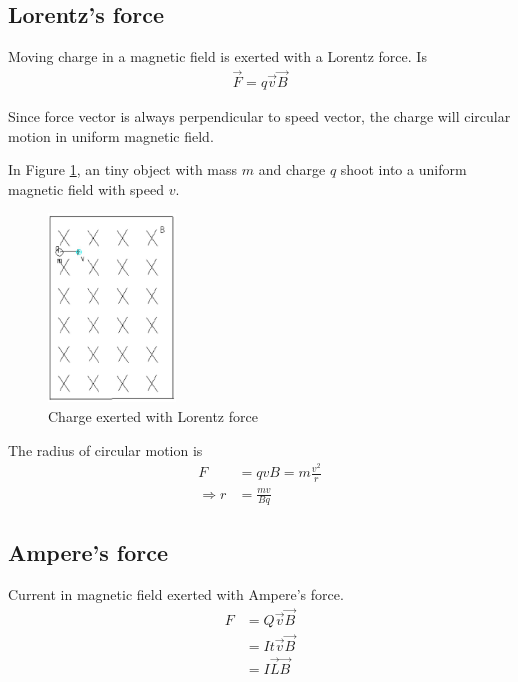 
    \subsection{Lorentz's force}
        Moving charge in a magnetic field is exerted with a Lorentz force. Is
        \begin{align}
            \vec{F} = q \vec{v} \vec{B}
        \end{align}

        Since force vector is always perpendicular to speed vector, the charge will circular motion in uniform magnetic field.

        In Figure \ref{llz_force}, an tiny object with mass $m$ and charge $q$ shoot into a uniform magnetic field with speed $v$. 
        \begin{figure}[H]
            \begin{center}
                \includegraphics[height=5cm]{electromagnetism_charts/llz_force.eps}
            \end{center}
            \caption{Charge exerted with Lorentz force}
            \label{llz_force}
        \end{figure}

        The radius of circular motion is
        \begin{align}
            F &= q v B = m \frac{v^2}{r} \\
            \Rightarrow r &= \frac{m v}{B q}
        \end{align}

    \subsection{Ampere's force}
        Current in magnetic field exerted with Ampere's force. 
        \begin{align}
            F &= Q \vec{v} \vec{B} \\
              &= I t \vec{v} \vec{B} \\
              &= I \vec{L} \vec{B}
        \end{align}

